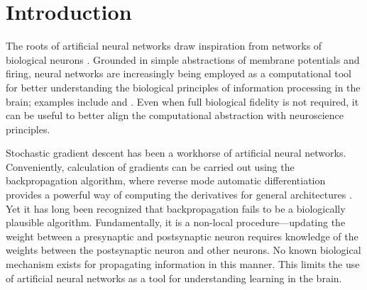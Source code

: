 \section{Introduction}

The roots of artificial neural networks draw inspiration from networks of biological neurons \citep{pdp,elman,medler}. Grounded in simple abstractions of membrane potentials and firing, neural networks are increasingly being employed as a computational tool for better understanding the biological principles of information processing in the brain; examples include \cite{ilker1} and \cite{yamins2}. Even when full biological fidelity is not required, it can be useful to better align the computational abstraction with neuroscience principles.

Stochastic gradient descent has been a workhorse of artificial neural networks. Conveniently, calculation of gradients can be carried out using the backpropagation algorithm, where reverse mode automatic differentiation provides a powerful way of computing the derivatives for general architectures \citep{rumelhart:86}.
Yet it has long been recognized that backpropagation fails to be a biologically plausible algorithm. Fundamentally, it is a non-local procedure---updating the weight between a presynaptic and postsynaptic neuron requires knowledge of the weights between the postsynaptic neuron and other neurons. No known biological mechanism exists for propagating information in this manner. This limits the use of artificial neural networks as a tool for understanding learning in the brain.

